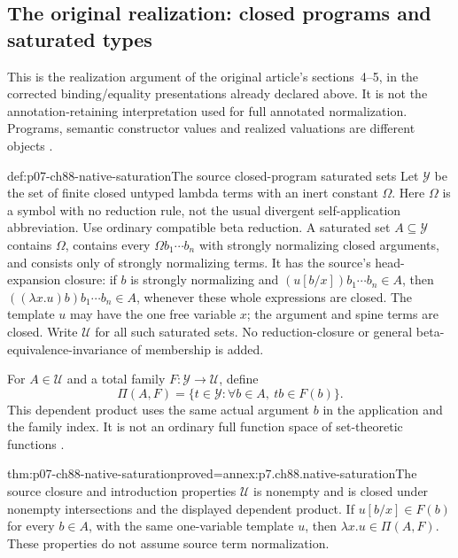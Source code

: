 \subsection{The original realization: closed programs and saturated types}
\label{sec:p07-ch88-realization}

This is the realization argument of the original article's sections~4--5,
in the corrected binding/equality presentations already declared above.
It is not the annotation-retaining interpretation used for full annotated
normalization. Programs, semantic constructor values and realized valuations
are different objects \cite[pp.~105--110]{CoquandHuet1988}.

\begin{hbdefinition}{def:p07-ch88-native-saturation}{The source closed-program saturated sets}
Let \(\mathcal Y\) be the set of finite closed untyped lambda terms with
an inert constant \(\Omega\). Here \(\Omega\) is a symbol with no
reduction rule, not the usual divergent self-application abbreviation.
Use ordinary compatible beta reduction. A saturated set \(A\subseteq
\mathcal Y\) contains \(\Omega\), contains every
\(\Omega b_1\cdots b_n\) with strongly normalizing closed arguments,
and consists only of strongly normalizing terms. It has the source's
head-expansion closure: if \(b\) is strongly normalizing and
\((u[b/x])b_1\cdots b_n\in A\), then
\(((\lambda x.u)b)b_1\cdots b_n\in A\), whenever these whole
expressions are closed. The template \(u\) may have the one free variable
\(x\); the argument and spine terms are closed. Write \(\mathcal U\)
for all such saturated sets. No reduction-closure or general
beta-equivalence-invariance of membership is added.

For \(A\in\mathcal U\) and a total family \(F:\mathcal Y\to
\mathcal U\), define
\[
 \Pi(A,F)=\{t\in\mathcal Y:\forall b\in A,\ tb\in F(b)\}.
\]
This dependent product uses the same actual argument \(b\) in the
application and the family index. It is not an ordinary full function
space of set-theoretic functions \cite[p.~107]{CoquandHuet1988}.
\end{hbdefinition}

\begin{hblemma}{thm:p07-ch88-native-saturation}{proved=annex:p7.ch88.native-saturation}{The source closure and introduction properties}
\(\mathcal U\) is nonempty and is closed under nonempty intersections
and the displayed dependent product. If \(u[b/x]\in F(b)\) for
every \(b\in A\), with the same one-variable template \(u\), then
\(\lambda x.u\in\Pi(A,F)\). These properties do not assume source
term normalization.
\end{hblemma}

